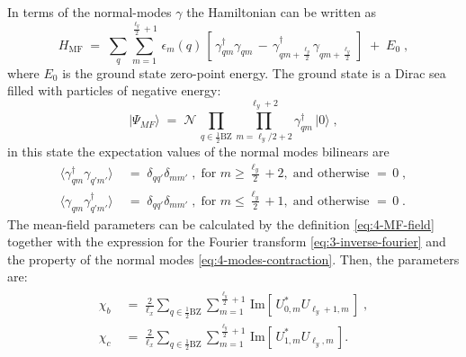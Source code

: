 In terms of the normal-modes $\gamma$ the Hamiltonian can be written as 
\begin{equation}
    H_{\text{MF}} \; = \; \sum_{q} \sum_{m=1}^{\frac{\ell_y}{2}+1} \, \epsilon_{m}(q) \, \left[ \, \gamma_{qm}^{\dagger} \gamma_{qm}^{\phantom{\dagger}} \, - \,  \gamma_{qm+\frac{\ell_y}{2}}^{\dagger}  \gamma_{qm+\frac{\ell_y}{2}}^{\phantom{\dagger}}\,   \right]\; + \; E_0 \; ,
\end{equation}
where $E_0$ is the ground state zero-point energy. The ground state is a Dirac sea filled with particles of negative energy:
\begin{equation}
    \vert \Psi_{MF} \rangle \; = \; \mathcal{N} \, \prod_{q\in \frac{1}{2}\text{BZ}}  %
    \prod_{m=\ell_y/2+2}^{\ell_y+2}\gamma_{qm}^{\dagger}  \, \vert 0 \rangle \; ,
\end{equation}
in this state the expectation values of the normal modes bilinears are
\begin{equation}
    \begin{split}
        \langle \gamma^{\dagger}_{qm} \gamma_{q'm'}^{\phantom{\dagger}} \rangle \; &= \; \delta_{qq'}\delta_{mm'} \;, \;  \text{for } m \geq \frac{\ell_y}{2} + 2, \; \text{and otherwise } = \, 0  \; , \\[6pt]
       \langle \gamma^{\phantom{\dagger}}_{qm} \gamma_{q'm'}^{\dagger} \rangle \; &= \; \delta_{qq'}\delta_{mm'}  \;, \;  \text{for } m \leq \frac{\ell_y}{2} + 1, \; \text{and otherwise } = \, 0  \; .
    \end{split} \label{eq:4-modes-contraction}
\end{equation}
The mean-field parameters can be calculated by the definition \eqref{eq:4-MF-field} together with the expression for the Fourier transform \eqref{eq:3-inverse-fourier} and the property of the normal modes \eqref{eq:4-modes-contraction}. Then, the parameters are:
\begin{align}
\begin{split}
    \chi_b \; &= \; \frac{2}{\ell_x} \sum_{q\in \frac{1}{2}\text{BZ}} \sum_{m=1}^{\frac{\ell_y}{2}+1} \, \text{Im} \left[ \, U^{\ast}_{0,m}U_{\ell_y+1,m} \, \right] \; , \\
    \chi_c \; &= \;\frac{2}{\ell_x} \sum_{q\in \frac{1}{2}\text{BZ}}  \sum_{m=1}^{\frac{\ell_y}{2}+1} \, \text{Im} \left[ \, U^{\ast}_{1,m}U_{\ell_y,m} \, \right]  .
    \end{split} \label{eq:4-MF-fields-final}
\end{align}

